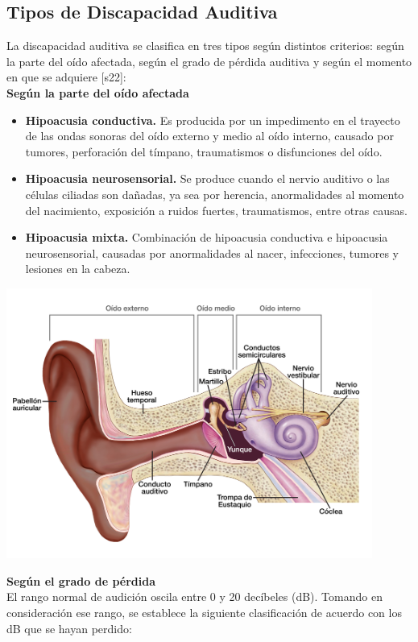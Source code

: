 \subsection{Tipos de Discapacidad Auditiva}
La discapacidad auditiva se clasifica en tres tipos según distintos criterios: según la parte del oído afectada, según el grado de pérdida auditiva y según el momento en que se adquiere [s22]:\\
\newline\textbf{Según la parte del oído afectada}
\begin{itemize}
    \item \textbf{Hipoacusia conductiva.} Es producida por un impedimento en el trayecto de las ondas sonoras del oído externo y medio al oído interno, causado por tumores, perforación del tímpano, traumatismos o disfunciones del oído.  
    \item \textbf{Hipoacusia neurosensorial.} Se produce cuando el nervio auditivo o las células ciliadas son dañadas, ya sea por herencia, anormalidades al momento del nacimiento, exposición a ruidos fuertes, traumatismos, entre otras causas.  
    \item \textbf{Hipoacusia mixta.} Combinación de hipoacusia conductiva e hipoacusia neurosensorial, causadas por anormalidades al nacer, infecciones, tumores y lesiones en la cabeza.  
\end{itemize}

\begin{center}
    \includegraphics[width=0.9\textwidth]{Images/Cap 2/PartesOido.jpg}
\end{center}

\textbf{Según el grado de pérdida}\\
El rango normal de audición oscila entre 0 y 20 decíbeles (dB). Tomando en consideración ese rango, se establece la siguiente clasificación de acuerdo con los dB que se hayan perdido:

